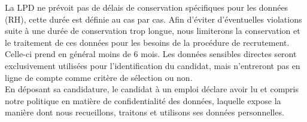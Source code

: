  La LPD ne prévoit pas de délais de conservation spécifiques pour les données (RH), cette durée est définie au cas par cas. Afin d'éviter d'éventuelles violations suite à une durée de conservation trop longue, nous limiterons la conservation et le traitement de ces données  pour les besoins de la procédure de recrutement. Celle-ci prend en général moins de 6 mois. Les données sensibles directes seront exclusivement utilisées pour l'identification du candidat, mais n'entreront pas en ligne de compte comme critère de sélection ou non. \\ 
En déposant sa candidature, le candidat à un emploi déclare avoir lu et compris notre politique en matière de confidentialité des données, laquelle expose la manière dont nous recueillons, traitons et utilisons ses données personnelles.